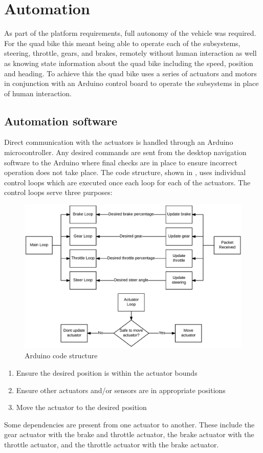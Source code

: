 \documentclass[main.tex]{subfiles}
\begin{document}
\section{Automation}

As part of the platform requirements, full autonomy of the vehicle was required. For the quad bike this meant being able to operate each of the subsystems, steering, throttle, gears, and brakes, remotely without human interaction as well as knowing state information about the quad bike including the speed, position and heading. To achieve this the quad bike uses a series of actuators and motors in conjunction with an Arduino control board to operate the subsystems in place of human interaction.

\subsection{Automation software}
Direct communication with the actuators is handled through an Arduino microcontroller. Any desired commands are sent from the desktop navigation software to the Arduino where final checks are in place to ensure incorrect operation does not take place. The code structure, shown in , uses individual control loops which are executed once each loop for each of the actuators. The control loops serve three purposes:
\begin{figure}[ht]
\includegraphics[width=\textwidth]{4-DetailedDesign/arduinoDiagram.png}
\centering
\caption{Arduino code structure} 
\end{figure}

\begin{enumerate}
\item Ensure the desired position is within the actuator bounds
\item Ensure other actuators and/or sensors are in appropriate positions
\item Move the actuator to the desired position
\end{enumerate}
Some dependencies are present from one actuator to another. These include the gear actuator with the brake and throttle actuator, the brake actuator with the throttle actuator, and the throttle actuator with the brake actuator.
\end{document}
